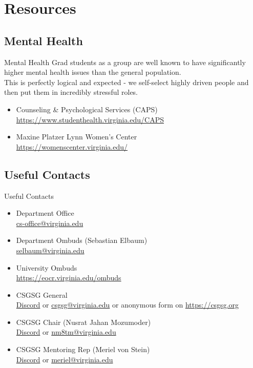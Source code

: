 \documentclass[aspectratio=169]{beamer}
\begin{document}
\section{Resources}
\subsection{Mental Health}
\begin{frame}{Mental Health}
Grad students as a group are well known to have significantly higher mental health issues than the general population. \\
This is perfectly logical and expected - we self-select highly driven people and then put them in incredibly stressful roles.
\begin{itemize}
    \item Counseling \& Psychological Services (CAPS)
    \\ \url{https://www.studenthealth.virginia.edu/CAPS}
    \item Maxine Platzer Lynn Women's Center
    \\ \url{https://womenscenter.virginia.edu/}
\end{itemize}
\end{frame}


\subsection{Useful Contacts}
\begin{frame}{Useful Contacts}
\begin{itemize}
    \item Department Office
    \\ \url{cs-office@virginia.edu}
    \item Department Ombuds (Sebastian Elbaum)
    \\ \url{selbaum@virginia.edu}
    \item University Ombuds
    \\ \url{https://eocr.virginia.edu/ombuds}
    \item CSGSG General
    \\ \href{https://discord.gg/rmdAP32E2g}{Discord} or \url{csgsg@virginia.edu} or anonymous form on \url{https://csgsg.org}
    \item CSGSG Chair (Nusrat Jahan Mozumoder)
    \\ \href{https://discord.gg/rmdAP32E2g}{Discord} or \url{nm8tm@virginia.edu}
    \item CSGSG Mentoring Rep (Meriel von Stein)
    \\ \href{https://discord.gg/rmdAP32E2g}{Discord} or \url{meriel@virginia.edu}
    
\end{itemize}
\end{frame}
\end{document}
